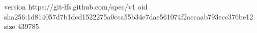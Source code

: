 version https://git-lfs.github.com/spec/v1
oid sha256:1d814057d7b1dcd1522275a0cca55b34e7dae561074f2accaab793ecc376be12
size 439785
